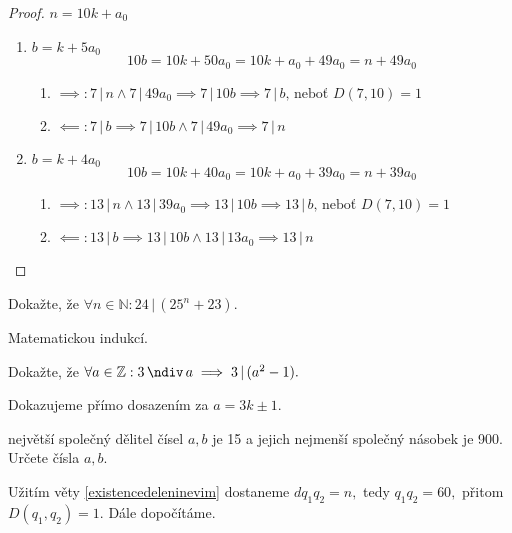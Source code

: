 \begin{proof}
  $n=10k+a_0$
  \begin{enumerate}[$i.$]
    \item $b=k+5a_0$
      \[
        10b=10k+50a_0=10k+a_0+49a_0=n+49a_0
      \]
      \begin{enumerate}
        \item $\implies: 7 \, | \, n \land 7 \, | \, 49a_0 \implies 7 \, | \, 10b \implies 7 \, | \, b \textrm{, neboť } D(7,10)=1$
        \item $\impliedby: 7 \, | \, b \implies 7 \, | \, 10 b \land 7 \, | \, 49 a_0 \implies 7 \, | \, n$
      \end{enumerate}
    \item $b=k+4a_0$
      \[
        10b=10k+40a_0=10k+a_0+39a_0=n+39a_0
      \]
      \begin{enumerate}
        \item $\implies: 13 \, | \, n \land 13 \, | \, 39a_0 \implies 13 \, | \, 10b \implies 13 \, | \, b \textrm{, neboť } D(7,10)=1$
        \item $\impliedby: 13 \, | \, b \implies  13 \, | \, 10 b \land 13 \, | \, 13a_0 \implies 13 \, | \, n$ \qedhere
      \end{enumerate}
  \end{enumerate}
\end{proof}

\begin{priklad}
Dokažte, že  $\forall n \in \mathbb N: 24 \, | \, (25^n+23).$
\end{priklad}

\begin{reseni}
Matematickou indukcí.
\end{reseni}

\begin{priklad}
Dokažte, že $\forall a \in \mathbb Z: 3 \, \ndiv \, a \implies 3 \, | \, (a^2-1).$
\end{priklad}

\begin{reseni}
Dokazujeme přímo dosazením za $a=3k\pm 1.$
\end{reseni}

\begin{priklad}
největší společný dělitel čísel $a,b$ je 15 a jejich nejmenší společný násobek je 900.
Určete čísla $a,b$.
\end{priklad}

\begin{reseni}
Užitím věty \ref{existencedeleninevim} dostaneme $dq_1q_2=n,$ tedy $q_1q_2=60,$ přitom
$D(q_1,q_2)=1.$ Dále dopočítáme.
\end{reseni}

